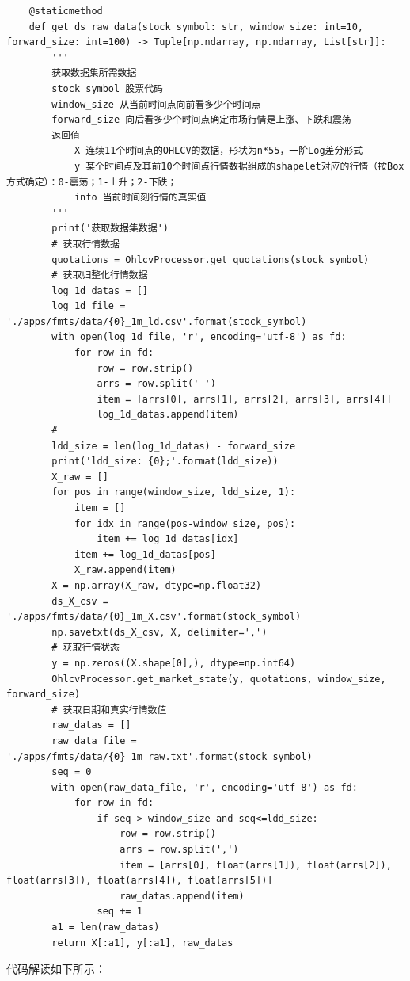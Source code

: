 \begin{lstlisting}
    @staticmethod
    def get_ds_raw_data(stock_symbol: str, window_size: int=10, forward_size: int=100) -> Tuple[np.ndarray, np.ndarray, List[str]]:
        '''
        获取数据集所需数据
        stock_symbol 股票代码
        window_size 从当前时间点向前看多少个时间点
        forward_size 向后看多少个时间点确定市场行情是上涨、下跌和震荡
        返回值 
            X 连续11个时间点的OHLCV的数据，形状为n*55，一阶Log差分形式
            y 某个时间点及其前10个时间点行情数据组成的shapelet对应的行情（按Box方式确定）：0-震荡；1-上升；2-下跌；
            info 当前时间刻行情的真实值
        '''
        print('获取数据集数据')
        # 获取行情数据
        quotations = OhlcvProcessor.get_quotations(stock_symbol)
        # 获取归整化行情数据
        log_1d_datas = []
        log_1d_file = './apps/fmts/data/{0}_1m_ld.csv'.format(stock_symbol)
        with open(log_1d_file, 'r', encoding='utf-8') as fd:
            for row in fd:
                row = row.strip()
                arrs = row.split(' ')
                item = [arrs[0], arrs[1], arrs[2], arrs[3], arrs[4]]
                log_1d_datas.append(item)
        # 
        ldd_size = len(log_1d_datas) - forward_size
        print('ldd_size: {0};'.format(ldd_size))
        X_raw = []
        for pos in range(window_size, ldd_size, 1):
            item = []
            for idx in range(pos-window_size, pos):
                item += log_1d_datas[idx]
            item += log_1d_datas[pos]
            X_raw.append(item)
        X = np.array(X_raw, dtype=np.float32)
        ds_X_csv = './apps/fmts/data/{0}_1m_X.csv'.format(stock_symbol)
        np.savetxt(ds_X_csv, X, delimiter=',')
        # 获取行情状态
        y = np.zeros((X.shape[0],), dtype=np.int64)
        OhlcvProcessor.get_market_state(y, quotations, window_size, forward_size)
        # 获取日期和真实行情数值
        raw_datas = []
        raw_data_file = './apps/fmts/data/{0}_1m_raw.txt'.format(stock_symbol)
        seq = 0
        with open(raw_data_file, 'r', encoding='utf-8') as fd:
            for row in fd:
                if seq > window_size and seq<=ldd_size:
                    row = row.strip()
                    arrs = row.split(',')
                    item = [arrs[0], float(arrs[1]), float(arrs[2]), float(arrs[3]), float(arrs[4]), float(arrs[5])]
                    raw_datas.append(item)
                seq += 1
        a1 = len(raw_datas)
        return X[:a1], y[:a1], raw_datas
\end{lstlisting}
代码解读如下所示：
